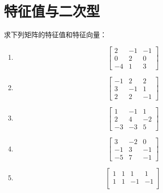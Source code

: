 \section{特征值与二次型}

\begin{problem}
求下列矩阵的特征值和特征向量：
\begin{enumerate}
    \item \begin{equation*}
              \begin{bmatrix}
                  2  & -1 & -1 \\
                  0  & 2  & 0  \\
                  -4 & 1  & 3
              \end{bmatrix}
          \end{equation*}
    \item \begin{equation*}
              \begin{bmatrix}
                  -1 & 2  & 2  \\
                  3  & -1 & 1  \\
                  2  & 2  & -1
              \end{bmatrix}
          \end{equation*}
    \item \begin{equation*}
              \begin{bmatrix}
                  1  & -1 & 1  \\
                  2  & 4  & -2 \\
                  -3 & -3 & 5
              \end{bmatrix}
          \end{equation*}
    \item \begin{equation*}
              \begin{bmatrix}
                  3  & -2 & 0  \\
                  -1 & 3  & -1 \\
                  -5 & 7  & -1
              \end{bmatrix}
          \end{equation*}
    \item \begin{equation*}
              \begin{bmatrix}
                  1 & 1  & 1  & 1  \\
                  1 & 1  & -1 & -1 \\

\end{bmatrix}
\end{equation*}
\end{enumerate}
\end{problem}
